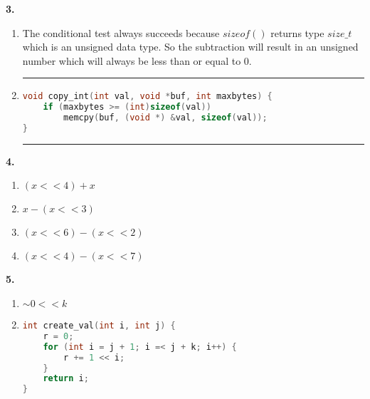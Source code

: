 \documentclass[11pt]{article} %
\newcommand{\hr}{\noindent\rule{14cm}{0.4pt}}
\begin{document}
\vspace{0.5in}
{\bf 3.}
\begin{enumerate}[label=\alph*)]
\item
The conditional test always succeeds because $sizeof()$ returns type $size\_t$ which is an unsigned data type. So the subtraction will result in an unsigned number which will always be less than or equal to $0$.
\item
\hr
\begin{lstlisting}[language=C]
void copy_int(int val, void *buf, int maxbytes) {
	if (maxbytes >= (int)sizeof(val))
		memcpy(buf, (void *) &val, sizeof(val));
}
\end{lstlisting}
\hr


\end{enumerate}


{\bf 4.}

\begin{enumerate}[label=\alph*)]
\item $(x << 4) + x$
\item $x - (x << 3)$
\item $(x << 6) - (x << 2)$
\item $(x << 4) - (x << 7)$
\end{enumerate}


\vspace{0.5in}
{\bf 5.}

\begin{enumerate}[label=\alph*)]


\item
$ \sim 0 << k$

\item
\begin{lstlisting}[language=C]
int create_val(int i, int j) {
	r = 0;
	for (int i = j + 1; i =< j + k; i++) {
		r += 1 << i;
	}
	return i;
}
\end{lstlisting}
\end{enumerate}
\end{document}
